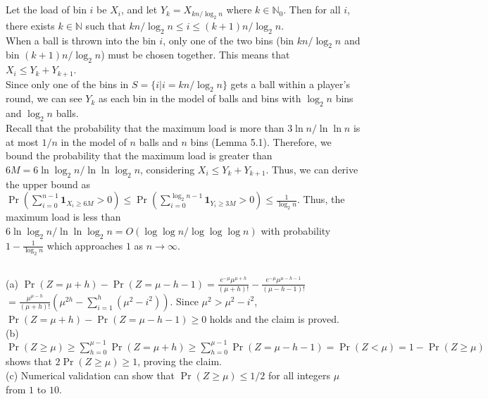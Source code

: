 \documentclass{article}
\begin{document}
\subsection{}
Let the load of bin $i$ be $X_i$, and let $Y_k=X_{kn/\log_2n}$ where $k\in\mathbb{N}_0$.
Then for all $i$, there exists $k\in \mathbb{N}$ such that $kn/\log_2 n \leq i \leq (k+1)n/\log_2 n$.\\
When a ball is thrown into the bin $i$, only one of the two bins (bin $kn/\log_2 n$ and bin $(k+1)n/\log_2 n$) must be chosen together. This means that $X_i \leq Y_k+Y_{k+1}$.\\
Since only one of the bins in $S=\{i|i=kn/\log_2 n\}$ gets a ball within a player's round, we can see $Y_k$ as each bin in the model of balls and bins with $\log_2 n$ bins and $\log_2 n$ balls.\\
Recall that the probability that the maximum load is more than $3\ln n/\ln\ln n$ is at most $1/n$ in the model of $n$ balls and $n$ bins (Lemma 5.1).
Therefore, we bound the probability that the maximum load is greater than $6M=6\ln \log_2 n / \ln\ln \log_2 n$, considering $X_i \leq Y_k + Y_{k+1}$.
Thus, we can derive the upper bound as $\Pr(\sum\limits_{i=0}^{n-1}\textbf{1}_{X_i\geq6M}>0)\leq\Pr(\sum\limits_{i=0}^{\log_2 n-1}\textbf{1}_{Y_i\geq 3M}>0)\leq \frac{1}{\log_2 n}$.
Thus, the maximum load is less than $6\ln \log_2 n / \ln\ln \log_2 n = O(\log\log n/\log\log\log n)$ with probability $1-\frac{1}{\log_2 n}$ which approaches $1$ as $n\rightarrow \infty$.
\subsection{}
(a) $\Pr(Z=\mu+h)-\Pr(Z=\mu-h-1)=\frac{e^{-\mu}\mu^{\mu+h}}{(\mu+h)!}-\frac{e^{-\mu}\mu^{\mu-h-1}}{(\mu-h-1)!}$
$=\frac{\mu^{\mu-h}}{(\mu+h)!}(\mu^{2h}-\sum\limits_{i=1}^h(\mu^2-i^2))$.
Since $\mu^2 > \mu^2 - i^2$, $\Pr(Z=\mu+h)-\Pr(Z=\mu-h-1)\geq 0$ holds and the claim is proved.\\
(b) $\Pr(Z\geq \mu)\geq \sum\limits_{h=0}^{\mu-1}\Pr(Z=\mu+h)\geq\sum\limits_{h=0}^{\mu-1}\Pr(Z=\mu-h-1)=\Pr(Z<\mu)=1-\Pr(Z\geq\mu)$
shows that $2\Pr(Z\geq\mu)\geq1$, proving the claim.\\
(c) Numerical validation can show that $\Pr(Z\geq \mu)\leq 1/2$ for all integers $\mu$ from $1$ to $10$.
\end{document}
